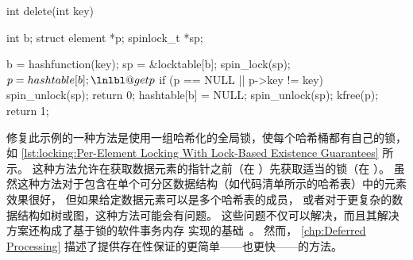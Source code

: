 \begin{listing}
\begin{fcvlabel}
\begin{VerbatimL}[commandchars=\\\@\$]
int delete(int key)
{
	int b;
	struct element *p;
	spinlock_t *sp;

	b = hashfunction(key);
	sp = &locktable[b];
	spin_lock(sp);				\lnlbl@acq$
	p = hashtable[b];			\lnlbl@getp$
	if (p == NULL || p->key != key) {
		spin_unlock(sp);
		return 0;
	}
	hashtable[b] = NULL;
	spin_unlock(sp);
	kfree(p);
	return 1;
}
\end{VerbatimL}
\end{fcvlabel}
\caption{具有基于锁的存在性保证的逐元素加锁}
\label{lst:locking:Per-Element Locking With Lock-Based Existence Guarantees}
\end{listing}

\begin{fcvref}
修复此示例的一种方法是使用一组哈希化的全局锁，使每个哈希桶都有自己的锁，如
\cref{lst:locking:Per-Element Locking With Lock-Based Existence Guarantees}
所示。
这种方法允许在获取数据元素的指针之前（在 ）先获取适当的锁（在 ）。
虽然这种方法对于包含在单个可分区数据结构（如代码清单所示的哈希表）中的元素效果很好，
但如果给定数据元素可以是多个哈希表的成员，
或者对于更复杂的数据结构如树或图，这种方法可能会有问题。
这些问题不仅可以解决，而且其解决方案还构成了基于锁的软件事务内存
实现的基础~\cite{Shavit95,DaveDice2006DISC}。
然而，
\cref{chp:Deferred Processing}
描述了提供存在性保证的更简单——也更快——的方法。
\end{fcvref}

